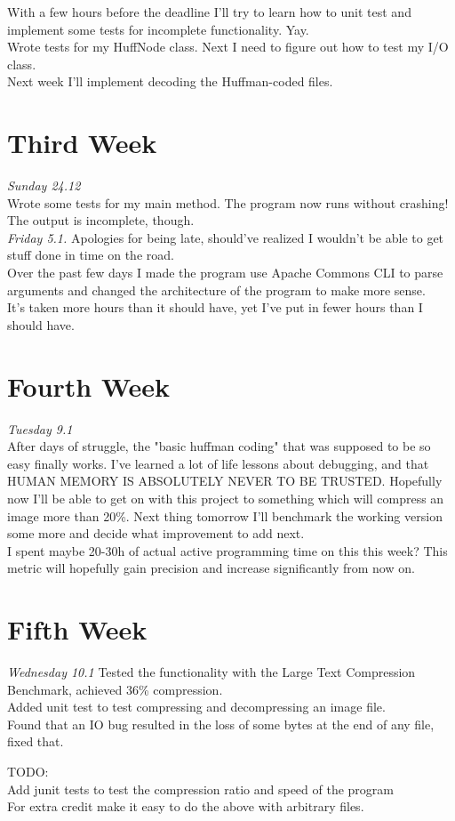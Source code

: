 \documentclass[11pt,a4paper,oneside,notitlepage,final]{article}
\begin{document}
	With a few hours before the deadline I'll try to learn how to unit test and implement some tests for incomplete functionality. Yay.\\
	Wrote tests for my HuffNode class. Next I need to figure out how to test my I/O class.\\
	Next week I'll implement decoding the Huffman-coded files.
	
	\section{Third Week}
	
	\emph{Sunday 24.12}\\
	Wrote some tests for my main method. The program now runs without crashing! The output is incomplete, though.\\
	
	\emph{Friday 5.1.}
	Apologies for being late, should've realized I wouldn't be able to get stuff done in time on the road.\\
	Over the past few days I made the program use Apache Commons CLI to parse arguments and changed the architecture of the program to make more sense.\\
	It's taken more hours than it should have, yet I've put in fewer hours than I should have.
	
	\section{Fourth Week}
	
	\emph{Tuesday 9.1}\\
	After days of struggle, the "basic huffman coding" that was supposed to be so easy finally works. I've learned a lot of life lessons about debugging, and that HUMAN MEMORY IS ABSOLUTELY NEVER TO BE TRUSTED. Hopefully now I'll be able to get on with this project to something which will compress an image more than 20\%. Next thing tomorrow I'll benchmark the working version some more and decide what improvement to add next.\\
	I spent maybe 20-30h of actual active programming time on this this week? This metric will hopefully gain precision and increase significantly from now on.
	
	\section{Fifth Week}
	\emph{Wednesday 10.1}
	Tested the functionality with the Large Text Compression Benchmark, achieved 36\% compression.\\Added unit test to test compressing and decompressing an image file.\\Found that an IO bug resulted in the loss of some bytes at the end of any file, fixed that.
	
	TODO:\\
	Add junit tests to test the compression ratio and speed of the program \\
	For extra credit make it easy to do the above with arbitrary files.
	
	
\end{document}
